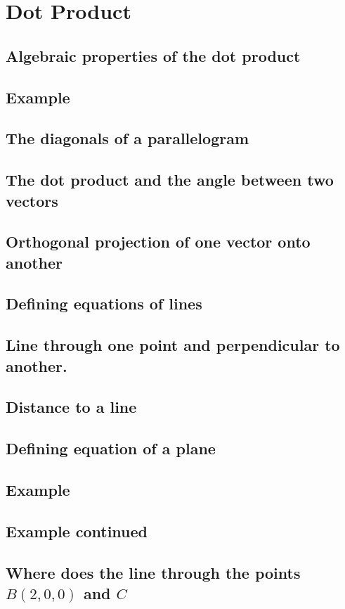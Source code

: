 \section{Dot Product}\label{sec:dot-product}
\subsection{Algebraic properties of the dot product}
\subsection{Example}
\subsection{The diagonals of a parallelogram}
\subsection{The dot product and the angle between two vectors}
\subsection{Orthogonal projection of one vector onto another}
\subsection{Defining equations of lines}
\subsection{Line through one point and perpendicular to another. }
\subsection{Distance to a line}
\subsection{Defining equation of a plane}
\subsection{Example} 
\subsection{Example continued}
\subsection{Where does the line through the points $B (2,0,0)$ and $C$}
